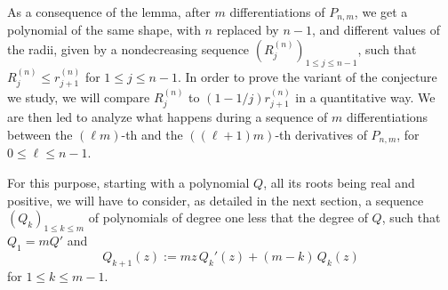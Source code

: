 \documentclass[11pt]{amsart}
\begin{document}
As a consequence of the lemma, after $m$ differentiations of $P_{n,m}$, we get a
polynomial of the same shape, with $n$ replaced by $n-1$, and different values of the radii, given 
by a nondecreasing sequence $(R_j^{(n)})_{1 \leq j \leq n-1}$, such that $R_j^{(n)} \leq r_{j+1}^{(n)}$
for $1 \leq j \leq n-1$. 
In order to prove the variant of the conjecture we study, we will compare $R_j^{(n)}$ to 
$(1 - 1/j) r_{j+1}^{(n)}$ in a quantitative way. 
 We are then led to analyze what happens during a sequence of $m$ differentiations between the 
 $(\ell m)$-th and the $((\ell+1) m)$-th 
 derivatives of $P_{n,m}$, for $0 \leq \ell \leq n-1$. 

 For this purpose, starting with a polynomial $Q$, all its roots being real and positive, we will have to consider, as detailed in the next section, a sequence $(Q_k)_{1 \leq k \leq m} 
$ of polynomials of degree one less that the degree of $Q$, such that $Q_1 = m Q'$ and 
$$ Q_{k+1}(z):= m z  \,Q_k'(z) + (m-k) \, Q_k(z)
$$ 
for $1 \leq k \leq m-1$. 
\vspace{1cm}
\end{document}
